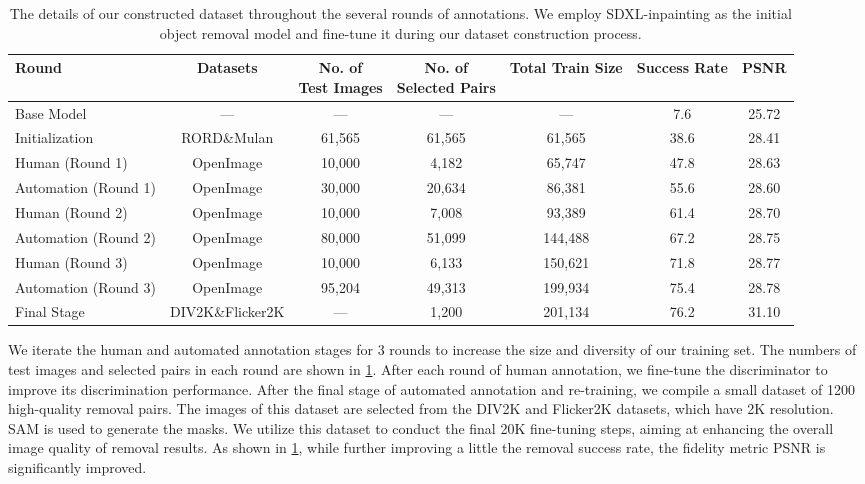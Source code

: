 \documentclass[10pt,twocolumn,letterpaper]{article}
\begin{document}
\begin{table}[t]
  \centering
  \begin{tabular}{@{}lcccccc@{}}
    \toprule
    Round & Datasets & \makecell[c]{No. of\\Test Images} & \makecell[c]{No. of\\Selected Pairs} & Total Train Size & Success Rate & PSNR\\
    \midrule
    Base Model & --- & --- & --- & --- & 7.6 & 25.72\\
    \midrule
    Initialization & RORD\&Mulan & 61,565 & 61,565 & 61,565 & 38.6 & 28.41\\
    Human (Round 1) & OpenImage & 10,000 & 4,182 & 65,747 & 47.8 & 28.63\\
    Automation (Round 1) & OpenImage & 30,000 & 20,634 & 86,381 & 55.6 & 28.60\\
    Human (Round 2)& OpenImage & 10,000 & 7,008 & 93,389 & 61.4& 28.70\\
    Automation (Round 2)& OpenImage & 80,000 & 51,099 & 144,488 & 67.2 & 28.75\\
    Human (Round 3)& OpenImage & 10,000 & 6,133 & 150,621 & 71.8 & 28.77\\
    Automation (Round 3)& OpenImage & 95,204 & 49,313 & 199,934 & 75.4 & 28.78\\
    \midrule
    Final Stage & DIV2K\&Flicker2K & --- & 1,200 & 201,134 & 76.2 & 31.10\\
    \bottomrule
  \end{tabular}
\vspace{-2mm}
  \caption{The details of our constructed dataset throughout the several rounds of annotations. We employ SDXL-inpainting as the initial object removal model and fine-tune it during our dataset construction process.}
  \label{tab:train_data}
\end{table}

We iterate the human and automated annotation stages for 3 rounds to increase the size and diversity of our training set. The numbers of test images and selected pairs in each round are shown in \cref{tab:train_data}. After each round of human annotation, we fine-tune the discriminator to improve its discrimination performance. 
After the final stage of automated annotation and re-training, we compile a small dataset of 1200 high-quality removal pairs. The images of this dataset are selected from the DIV2K \cite{Agustsson_2017_CVPR_Workshops} and Flicker2K \cite{timofte2017ntire} datasets, which have 2K resolution. SAM \cite{kirillov2023segment} is used to generate the masks. We utilize this dataset to conduct the final 20K fine-tuning steps, aiming at enhancing the overall image quality of removal results. As shown in \cref{tab:train_data}, while further improving a little the removal success rate, the fidelity metric PSNR is significantly improved.
\end{document}
